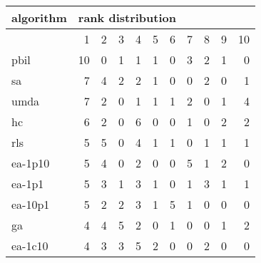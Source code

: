 \begin{tabular}{@{}l*{10}{r}@{}}
\toprule
algorithm & \multicolumn{10}{l}{{rank distribution}}\\
\midrule
& 1 & 2 & 3 & 4 & 5 & 6 & 7 & 8 & 9 & 10\\
\midrule
pbil & 10 & 0 & 1 & 1 & 1 & 0 & 3 & 2 & 1 & 0\\
sa & 7 & 4 & 2 & 2 & 1 & 0 & 0 & 2 & 0 & 1\\
umda & 7 & 2 & 0 & 1 & 1 & 1 & 2 & 0 & 1 & 4\\
hc & 6 & 2 & 0 & 6 & 0 & 0 & 1 & 0 & 2 & 2\\
rls & 5 & 5 & 0 & 4 & 1 & 1 & 0 & 1 & 1 & 1\\
ea-1p10 & 5 & 4 & 0 & 2 & 0 & 0 & 5 & 1 & 2 & 0\\
ea-1p1 & 5 & 3 & 1 & 3 & 1 & 0 & 1 & 3 & 1 & 1\\
ea-10p1 & 5 & 2 & 2 & 3 & 1 & 5 & 1 & 0 & 0 & 0\\
ga & 4 & 4 & 5 & 2 & 0 & 1 & 0 & 0 & 1 & 2\\
ea-1c10 & 4 & 3 & 3 & 5 & 2 & 0 & 0 & 2 & 0 & 0\\
\bottomrule
\end{tabular}
